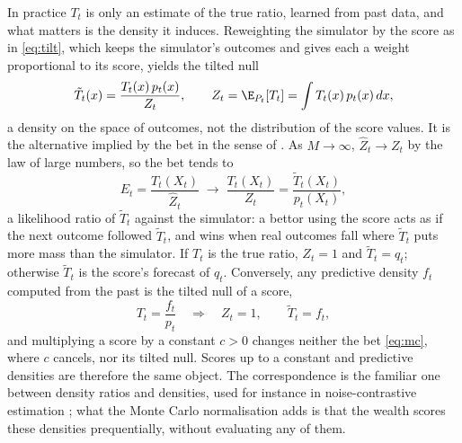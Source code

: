 In practice $T_t$ is only an estimate of the true ratio, learned from past
data, and what matters is the density it induces. Reweighting the simulator by
the score as in \eqref{eq:tilt}, which keeps the simulator's outcomes and gives
each a weight proportional to its score, yields the tilted null
\[
\tilde T_t(x) = \frac{T_t(x)\,p_t(x)}{Z_t},
\qquad
Z_t = \E_{P_t}[T_t] = \int T_t(x)\,p_t(x)\,dx ,
\]
a density on the space of outcomes, not the distribution of the score values.
It is the alternative implied by the bet in the sense of
\citet{shafer2021testing}. As $M \to \infty$, $\widehat Z_t \to Z_t$ by the
law of large numbers, so the bet tends to
\[
E_t = \frac{T_t(X_t)}{\widehat Z_t} \;\to\; \frac{T_t(X_t)}{Z_t}
= \frac{\tilde T_t(X_t)}{p_t(X_t)} ,
\]
a likelihood ratio of $\tilde T_t$ against the simulator: a bettor using the
score acts as if the next outcome followed $\tilde T_t$, and wins when real
outcomes fall where $\tilde T_t$ puts more mass than the simulator. If $T_t$
is the true ratio, $Z_t = 1$ and $\tilde T_t = q_t$; otherwise $\tilde T_t$
is the score's forecast of $q_t$. Conversely, any predictive density $f_t$
computed from the past is the tilted null of a score,
\[
T_t = \frac{f_t}{p_t}
\quad\Longrightarrow\quad
Z_t = 1,
\qquad
\tilde T_t = f_t ,
\]
and multiplying a score by a constant $c > 0$ changes neither the bet
\eqref{eq:mc}, where $c$ cancels, nor its tilted null. Scores up to a
constant and predictive densities are therefore the same object. The
correspondence is the familiar one between density ratios and densities,
used for instance in noise-contrastive estimation \citep{gutmann2012noise};
what the Monte Carlo normalisation adds is that the wealth scores these
densities prequentially, without evaluating any of them.

